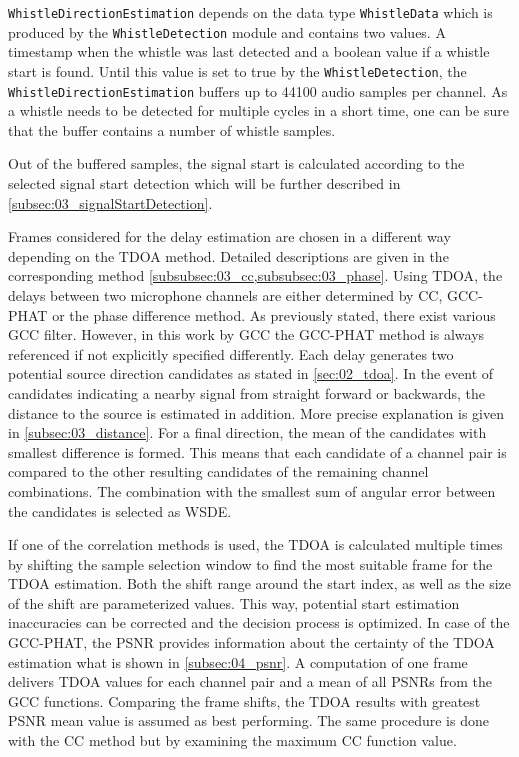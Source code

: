 \lstinline!WhistleDirectionEstimation! depends on the data type \lstinline!WhistleData!
which is produced by the \lstinline!WhistleDetection! module and contains two values.
A timestamp when the whistle was last detected
and a boolean value if a whistle start is found.
Until this value is set to true by the \lstinline!WhistleDetection!, the
\lstinline!WhistleDirectionEstimation! buffers up to
44100 audio samples per channel.
As a whistle needs to be detected for multiple cycles in a short time, one can
be sure that the buffer contains a number of whistle samples.

Out of the buffered samples, the signal start is calculated
according to the selected signal start detection
which will be further described in \cref{subsec:03_signalStartDetection}.

Frames considered for the delay estimation
are chosen in a different way depending on the \ac{TDOA} method.
Detailed descriptions are given in the corresponding method
\cref{subsubsec:03_cc,subsubsec:03_phase}.
Using \ac{TDOA}, the delays between two microphone channels are either
determined by \ac{CC}, \ac{GCC-PHAT} or the phase difference method.
As previously stated, there exist various \ac{GCC} filter.
However, in this work by \ac{GCC} the \ac{GCC-PHAT} method is always referenced
if not explicitly specified differently.
Each delay generates two potential source direction candidates as stated
in \cref{sec:02_tdoa}.
In the event of candidates indicating a nearby signal from straight forward or
backwards, the distance to the source is estimated in addition.
More precise explanation is given in \cref{subsec:03_distance}.
For a final direction, the mean of the candidates with smallest difference
is formed.
This means that each candidate of a channel pair is compared to the other resulting candidates
of the remaining channel combinations.
The combination with the smallest sum of angular error between the candidates is selected as
\acl{WSDE}.

If one of the correlation methods is used, the \ac{TDOA} is calculated
multiple times by shifting the sample selection window to find the most
suitable frame for the \ac{TDOA} estimation.
Both the shift range around the start index, as well as the size of the shift are
parameterized values.
This way, potential start estimation inaccuracies can be corrected and
the decision process is optimized.
In case of the \ac{GCC-PHAT}, the \ac{PSNR} provides information about
the certainty of the \ac{TDOA} estimation what is shown in \cref{subsec:04_psnr}.
A computation of one frame delivers \ac{TDOA} values for each channel pair and a
mean of all \acp{PSNR} from the \ac{GCC} functions.
Comparing the frame shifts, the \ac{TDOA} results with
greatest \ac{PSNR} mean value is assumed as best performing.
The same procedure is done with the \ac{CC} method but by examining
the maximum \ac{CC} function value.

